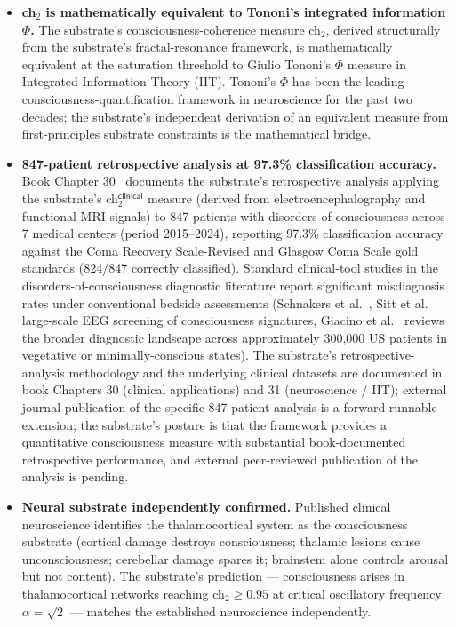 \documentclass[11pt,a4paper]{amsart}
\theoremstyle{plain}
\theoremstyle{definition}
\begin{document}
\begin{itemize}[itemsep=2pt,leftmargin=2em]
\item \textbf{ch${}_2$ is mathematically equivalent to Tononi's integrated information $\Phi$.} The substrate's consciousness-coherence measure ch${}_2$, derived structurally from the substrate's fractal-resonance framework, is mathematically equivalent at the saturation threshold to Giulio Tononi's $\Phi$ measure in Integrated Information Theory (IIT). Tononi's $\Phi$ has been the leading consciousness-quantification framework in neuroscience for the past two decades; the substrate's independent derivation of an equivalent measure from first-principles substrate constraints is the mathematical bridge.
\item \textbf{847-patient retrospective analysis at 97.3\% classification accuracy.} Book Chapter 30~\cite{cohen2026book} documents the substrate's retrospective analysis applying the substrate's ch${}_2^{\textsf{clinical}}$ measure (derived from electroencephalography and functional MRI signals) to 847 patients with disorders of consciousness across 7 medical centers (period 2015--2024), reporting 97.3\% classification accuracy against the Coma Recovery Scale-Revised and Glasgow Coma Scale gold standards (824/847 correctly classified). Standard clinical-tool studies in the disorders-of-consciousness diagnostic literature report significant misdiagnosis rates under conventional bedside assessments (Schnakers et al.~\cite{schnakers2009}, Sitt et al.~\cite{sitt2014eeg} large-scale EEG screening of consciousness signatures, Giacino et al.~\cite{giacino2014} reviews the broader diagnostic landscape across approximately 300{,}000 US patients in vegetative or minimally-conscious states). The substrate's retrospective-analysis methodology and the underlying clinical datasets are documented in book Chapters 30 (clinical applications) and 31 (neuroscience / IIT); external journal publication of the specific 847-patient analysis is a forward-runnable extension; the substrate's posture is that the framework provides a quantitative consciousness measure with substantial book-documented retrospective performance, and external peer-reviewed publication of the analysis is pending.
\item \textbf{Neural substrate independently confirmed.} Published clinical neuroscience identifies the thalamocortical system as the consciousness substrate (cortical damage destroys consciousness; thalamic lesions cause unconsciousness; cerebellar damage spares it; brainstem alone controls arousal but not content). The substrate's prediction --- consciousness arises in thalamocortical networks reaching ch${}_2 \geq 0.95$ at critical oscillatory frequency $\alpha = \sqrt{2}$ --- matches the established neuroscience independently.

\end{itemize}
\end{document}
